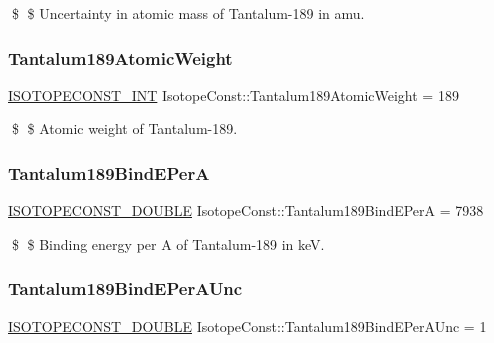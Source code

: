 \$ \$ Uncertainty in atomic mass of Tantalum-\/189 in amu. \mbox{\label{group___isotope_const-_tantalum-_ta189_gadbffca15945c8090b56532016caaa7b3}} 
\subsubsection{\texorpdfstring{Tantalum189\+Atomic\+Weight}{Tantalum189AtomicWeight}}
{\footnotesize\ttfamily \mbox{\hyperlink{group___isotope_const-_macros_ga5f18360b3e99483a35c32d789e62621c}{I\+S\+O\+T\+O\+P\+E\+C\+O\+N\+S\+T\+\_\+\+I\+NT}} Isotope\+Const\+::\+Tantalum189\+Atomic\+Weight = 189}

\$ \$ Atomic weight of Tantalum-\/189. \mbox{\label{group___isotope_const-_tantalum-_ta189_ga6e89119f9ed0fe310612679a33b6ed39}} 
\subsubsection{\texorpdfstring{Tantalum189\+Bind\+E\+PerA}{Tantalum189BindEPerA}}
{\footnotesize\ttfamily \mbox{\hyperlink{group___isotope_const-_macros_ga8f45a7272ce02c0b4c65c44636ed719a}{I\+S\+O\+T\+O\+P\+E\+C\+O\+N\+S\+T\+\_\+\+D\+O\+U\+B\+LE}} Isotope\+Const\+::\+Tantalum189\+Bind\+E\+PerA = 7938}

\$ \$ Binding energy per A of Tantalum-\/189 in keV. \mbox{\label{group___isotope_const-_tantalum-_ta189_ga1e38bb419af6bae6ea59ec252e206d70}} 
\subsubsection{\texorpdfstring{Tantalum189\+Bind\+E\+Per\+A\+Unc}{Tantalum189BindEPerAUnc}}
{\footnotesize\ttfamily \mbox{\hyperlink{group___isotope_const-_macros_ga8f45a7272ce02c0b4c65c44636ed719a}{I\+S\+O\+T\+O\+P\+E\+C\+O\+N\+S\+T\+\_\+\+D\+O\+U\+B\+LE}} Isotope\+Const\+::\+Tantalum189\+Bind\+E\+Per\+A\+Unc = 1}

